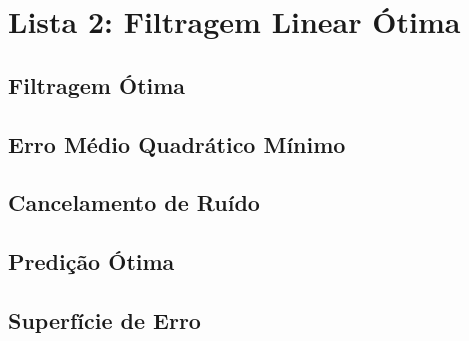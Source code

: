 \section{Lista 2: Filtragem Linear Ótima}

\subsection{Filtragem Ótima}

\subsection{Erro Médio Quadrático Mínimo}

\subsection{Cancelamento de Ruído}

\subsection{Predição Ótima}

\subsection{Superfície de Erro}
